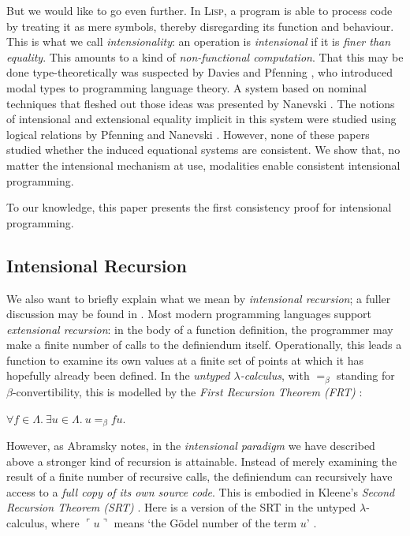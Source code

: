 \documentclass[11pt]{entcs}
\begin{document}
But we would like to go even further. In \textsc{Lisp}, a program
is able to process code by treating it as mere symbols, thereby
disregarding its function and behaviour. This is what we call
\emph{intensionality}: an operation is \emph{intensional} if it is
\emph{finer than equality}. This amounts to a kind of
\emph{non-functional computation}. That this may be done
type-theoretically was suspected by Davies and Pfenning
\cite{Davies2001,Davies2001a}, who introduced modal types to
programming language theory. A system based on nominal techniques
that fleshed out those ideas was presented by Nanevski
\cite{Nanevski2002}. The notions of intensional and extensional
equality implicit in this system were studied using logical
relations by Pfenning and Nanevski \cite{Nanevski2005}. However,
none of these papers studied whether the induced equational
systems are consistent. We show that, no matter the intensional
mechanism at use, modalities enable consistent intensional
programming.

To our knowledge, this paper presents the first consistency proof
for intensional programming.

\subsection{Intensional Recursion}

We also want to briefly explain what we mean by \emph{intensional
recursion}; a fuller discussion may be found in
\cite{Abramsky2014,Kavvos2017}. Most modern programming languages
support \emph{extensional recursion}: in the body of a function
definition, the programmer may make a finite number of calls to
the definiendum itself. Operationally, this leads a function to
examine its own values at a finite set of points at which it has
hopefully already been defined. In the \emph{untyped
$\lambda$-calculus}, with $=_\beta$ standing for
$\beta$-convertibility, this is modelled by the \emph{First
Recursion Theorem (FRT)} \cite[\S 6.1]{Barendregt1984}:

\begin{thm}
  $\forall f \in \Lambda.\
  \exists u \in \Lambda.\
  u =_\beta fu$.
\end{thm}

However, as Abramsky \cite{Abramsky2014} notes, in the
\emph{intensional paradigm} we have described above a stronger
kind of recursion is attainable. Instead of merely examining the
result of a finite number of recursive calls, the definiendum can
recursively have access to a \emph{full copy of its own source
code}. This is embodied in Kleene's \emph{Second Recursion Theorem
(SRT)} \cite{Kleene1938}. Here is a version of the SRT in the
untyped $\lambda$-calculus, where $\ulcorner u \urcorner$ means
`the G\"odel number of the term $u$' \cite[\S 6.5, Thm.
6.5.9]{Barendregt1984}.
\end{document}
